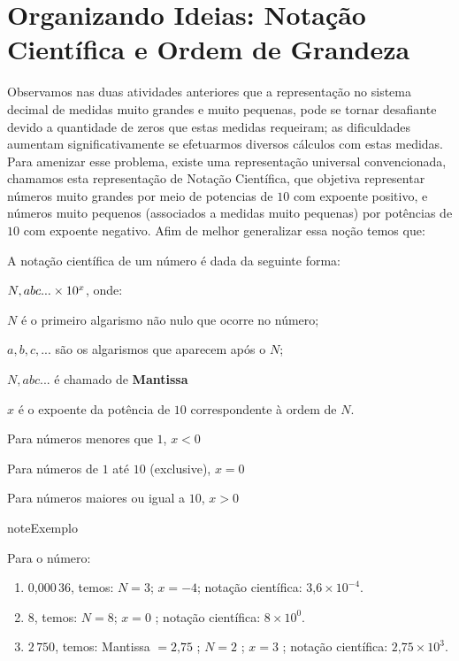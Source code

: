 \section{Organizando Ideias: Notação Científica e Ordem de Grandeza}
\label{\detokenize{NO103-4:organizando-ideias-notacao-cientifica-e-ordem-de-grandeza}}\label{\detokenize{NO103-4::doc}}
Observamos nas duas atividades anteriores que a representação no sistema decimal de medidas muito grandes e muito pequenas, pode se tornar desafiante devido a quantidade de zeros que estas medidas requeiram; as dificuldades aumentam significativamente se efetuarmos diversos cálculos com estas medidas. Para amenizar esse problema, existe uma representação universal convencionada, chamamos esta representação de Notação Científica, que objetiva representar números muito grandes por meio de potencias de \(10\) com expoente positivo, e números muito pequenos (associados a medidas muito pequenas) por potências de \(10\) com expoente negativo. Afim de melhor generalizar essa noção temos que:

A notação científica de um número é dada da seguinte forma:

\(\Large N, abc... \times 10^x\), onde:

\(N\) é o primeiro algarismo não nulo que ocorre no número;

\(a, b, c, ...\) são os algarismos que aparecem após o \(N\);

\(N, abc...\) é chamado de \textbf{Mantissa}

\(x\) é o expoente da potência de \(10\) correspondente à ordem de \(N\).

Para números menores que \(1\), \(x < 0\)

Para números de \(1\) até \(10\) (exclusive), \(x = 0\)

Para números maiores ou igual a \(10\), \(x > 0\)

\begin{sphinxadmonition}{note}{Exemplo}

Para o número:
\begin{enumerate}
\item {} 
\(0\text{,}000\, 36\), temos: \(N = 3\); \(x = -4\); notação científica: \(3\text{,}6 \times 10^{-4}\).

\item {} 
\(8\), temos: \(N=8\); \(x=0\) ; notação científica: \(8 \times 10^0\).

\item {} 
\(2\, 750\), temos: Mantissa \(=2\text{,}75\) ; \(N=2\) ; \(x=3\) ; notação científica: \(2\text{,}75 \times 10^3\).

\end{enumerate}
\end{sphinxadmonition}


